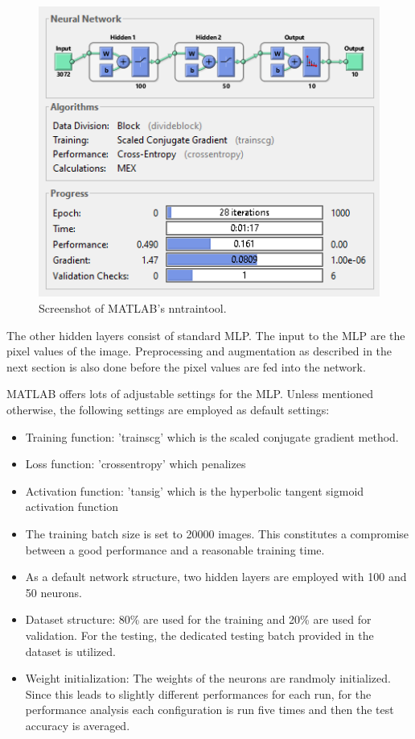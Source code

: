 \begin{figure}[h!]
  	\centering
  	\includegraphics{images/NNtool}
  	\caption{Screenshot of MATLAB's nntraintool.}
  	\label{fig:NNtool}
\end{figure}

The other hidden layers consist of standard MLP. The input to the MLP are the pixel values of the image. Preprocessing and augmentation as described in the next section is also done before the pixel values are fed into the network.

MATLAB offers lots of adjustable settings for the MLP. Unless mentioned otherwise, the following settings are employed as default settings:

\begin{itemize}
	\item Training function: 'trainscg' which is the scaled conjugate gradient method.

	\item Loss function: 'crossentropy' which penalizes

	\item Activation function: 'tansig' which is the hyperbolic tangent sigmoid activation function

	\item The training batch size is set to 20000 images. This constitutes a compromise between a good performance and a reasonable training time.

	\item As a default network structure, two hidden layers are employed with 100 and 50 neurons.

	\item Dataset structure: 80\% are used for the training and 20\% are used for validation. For the testing, the dedicated testing batch provided in the dataset is utilized.

	\item Weight initialization: The weights of the neurons are randmoly initialized. Since this leads to slightly different performances for each run, for the performance analysis each configuration is run five times and then the test accuracy is averaged.
\end{itemize}

